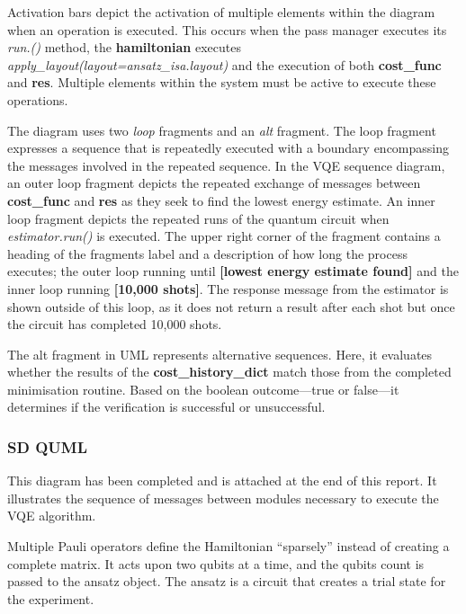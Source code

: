 \documentclass{article}
\begin{document}
{Activation bars depict the activation of multiple elements within the diagram when an operation is executed\cite{creatley}. This occurs when the pass manager executes its \textit{run.()} method, the  \textbf{hamiltonian} executes \textit{apply\_layout(layout=ansatz\_isa.layout)} and the execution of both \textbf{cost\_func} and \textbf{res}. Multiple elements within the system must be active to execute these operations.

The diagram uses two \textit{loop} fragments and an \textit{alt} fragment. The loop fragment expresses a sequence that is repeatedly executed\cite{Seidl_Scholz_Huemer_Kappel_Duffy_2014} with a boundary encompassing the messages involved in the repeated sequence. In the VQE sequence diagram, an outer loop fragment depicts the repeated exchange of messages between \textbf{cost\_func} and \textbf{res} as they seek to find the lowest energy estimate. An inner loop fragment depicts the repeated runs of the quantum circuit when \textit{estimator.run()} is executed. The upper right corner of the fragment contains a heading of the fragments label and a description of how long the process executes; the outer loop running until \textbf{[lowest energy estimate found]} and the inner loop running \textbf{[10,000 shots]}. The response message from the estimator is shown outside of this loop, as it does not return a result after each shot but once the circuit has completed 10,000 shots. 

The alt fragment in UML represents alternative sequences\cite{Seidl_Scholz_Huemer_Kappel_Duffy_2014}. Here, it evaluates whether the results of the \textbf{cost\_history\_dict} match those from the completed minimisation routine. Based on the boolean outcome—true or false—it determines if the verification is successful or unsuccessful.

\subsubsection{SD QUML}

This diagram has been completed and is attached at the end of this report. It illustrates the sequence of messages between modules necessary to execute the VQE algorithm. 

Multiple Pauli operators define the Hamiltonian “sparsely” instead of creating a complete matrix. It acts upon two qubits at a time, and the qubits count is passed to the ansatz object. The ansatz is a circuit that creates a trial state for the experiment. 

}
\end{document}
